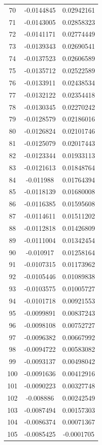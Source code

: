 \documentclass[a4paper, 11pt, oneside]{report}
\begin{document}
{\begin{longtable}{|c|c|c|}
70  & -0.0144845 & 0.02942161 \\
71  & -0.0143005 & 0.02858323 \\
72  & -0.0141171 & 0.02774449 \\
73  & -0.0139343 & 0.02690541 \\
74  & -0.0137523 & 0.02606589 \\
75  & -0.0135712 & 0.02522589 \\
76  & -0.0133911 & 0.02438534 \\
77  & -0.0132122 & 0.02354418 \\
78  & -0.0130345 & 0.02270242 \\
79  & -0.0128579 & 0.02186016 \\
80  & -0.0126824 & 0.02101746 \\
81  & -0.0125079 & 0.02017443 \\
82  & -0.0123344 & 0.01933113 \\
83  & -0.0121613 & 0.01848764 \\
84  & -0.011988  & 0.01764394 \\
85  & -0.0118139 & 0.01680008 \\
86  & -0.0116385 & 0.01595608 \\
87  & -0.0114611 & 0.01511202 \\
88  & -0.0112818 & 0.01426809 \\
89  & -0.0111004 & 0.01342454 \\
90  & -0.010917  & 0.01258164 \\
91  & -0.0107315 & 0.01173962 \\
92  & -0.0105446 & 0.01089838 \\
93  & -0.0103575 & 0.01005727 \\
94  & -0.0101718 & 0.00921553 \\
95  & -0.0099891 & 0.00837243 \\
96  & -0.0098108 & 0.00752727 \\
97  & -0.0096382 & 0.00667992 \\
98  & -0.0094722 & 0.00583082 \\
99  & -0.0093137 & 0.00498042 \\
100 & -0.0091636 & 0.00412916 \\
101 & -0.0090223 & 0.00327748 \\
102 & -0.008886  & 0.00242549 \\
103 & -0.0087494 & 0.00157303 \\
104 & -0.0086374 & 0.00071367 \\
105 & -0.0085425 & -0.0001705 \\

\end{longtable}}
\end{document}
